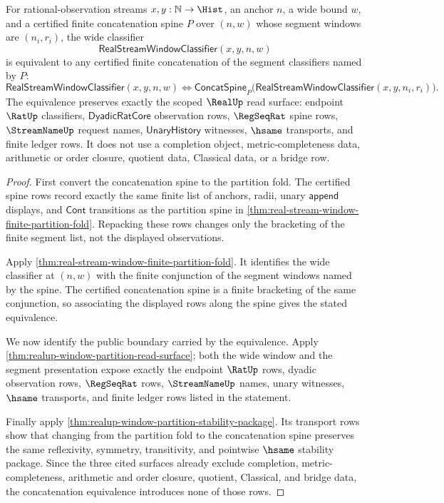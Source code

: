 \begin{theorem}
\label{thm:real-stream-window-overlap-concatenation-exactness}
For rational-observation streams $x,y:\mathbb{N}\to\Hist$, an anchor $n$, a
wide bound $w$, and a certified finite concatenation spine $P$ over $(n,w)$
whose segment windows are $(n_i,r_i)$, the wide classifier
$$
\mathsf{RealStreamWindowClassifier}(x,y,n,w)
$$
is equivalent to any certified finite concatenation of the segment classifiers
named by $P$:
$$
\mathsf{RealStreamWindowClassifier}(x,y,n,w)
\Longleftrightarrow
\mathsf{ConcatSpine}_{P}
\bigl(\mathsf{RealStreamWindowClassifier}(x,y,n_i,r_i)\bigr).
$$
The equivalence preserves exactly the scoped $\RealUp$ read surface: endpoint
$\RatUp$ classifiers, $\mathsf{DyadicRatCore}$ observation rows, $\RegSeqRat$
spine rows, $\StreamNameUp$ request names, $\mathsf{UnaryHistory}$ witnesses,
$\hsame$ transports, and finite ledger rows. It does not use a completion
object, metric-completeness data, arithmetic or order closure, quotient data,
Classical data, or a bridge row.
\end{theorem}
\begin{proof}
First convert the concatenation spine to the partition fold. The certified
spine rows record exactly the same finite list of anchors, radii, unary
$\mathsf{append}$ displays, and $\mathsf{Cont}$ transitions as the partition
spine in \autoref{thm:real-stream-window-finite-partition-fold}. Repacking
these rows changes only the bracketing of the finite segment list, not the
displayed observations.

Apply \autoref{thm:real-stream-window-finite-partition-fold}. It identifies the
wide classifier at $(n,w)$ with the finite conjunction of the segment windows
named by the spine. The certified concatenation spine is a finite bracketing of
the same conjunction, so associating the displayed rows along the spine gives
the stated equivalence.

We now identify the public boundary carried by the equivalence. Apply
\autoref{thm:realup-window-partition-read-surface}; both the wide window and
the segment presentation expose exactly the endpoint $\RatUp$ rows, dyadic
observation rows, $\RegSeqRat$ rows, $\StreamNameUp$ names, unary witnesses,
$\hsame$ transports, and finite ledger rows listed in the statement.

Finally apply \autoref{thm:realup-window-partition-stability-package}. Its
transport rows show that changing from the partition fold to the concatenation
spine preserves the same reflexivity, symmetry, transitivity, and pointwise
$\hsame$ stability package. Since the three cited surfaces already exclude
completion, metric-completeness, arithmetic and order closure, quotient,
Classical, and bridge data, the concatenation equivalence introduces none of
those rows.
\end{proof}

